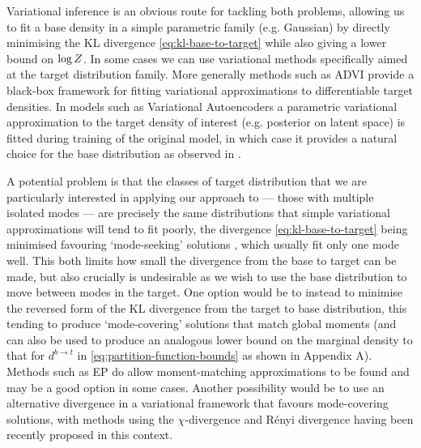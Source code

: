 Variational inference is an obvious route for tackling both problems, allowing us to fit a base density in a simple parametric family (e.g. Gaussian) by directly minimising the KL divergence \eqref{eq:kl-base-to-target} while also giving a lower bound on $\log Z$. In some cases we can use variational methods specifically aimed at the target distribution family. More generally methods such as \ac{ADVI} \citep{kucukelbir2016automatic} provide a black-box framework for fitting variational approximations to differentiable target densities. In models such as Variational Autoencoders \citep{kingma2013auto,rezende2014stochastic} a parametric variational approximation to the target density of interest (e.g. posterior on latent space) is fitted during training of the original model, in which case it provides a natural choice for the base distribution as observed in \citep{wu2016quantitative}. 

A potential problem is that the classes of target distribution that we are particularly interested in applying our approach to --- those with multiple isolated modes --- are precisely the same distributions that simple variational approximations will tend to fit poorly, the divergence \eqref{eq:kl-base-to-target} being minimised favouring `mode-seeking' solutions \citep{bishop2006pattern}, which usually fit only one mode well. This both limits how small the divergence from the base to target can be made, but also crucially is undesirable as we wish to use the base distribution to move between modes in the target.
One option would be to instead to minimise the reversed form of the KL divergence from the target to base distribution, this tending to produce `mode-covering' solutions that match global moments (and can also be used to produce an analogous lower bound on the marginal density to that for $d^{b\to t}$ in \eqref{eq:partition-function-bounds} as shown in Appendix A). Methods such as \ac{EP} \citep{minka2001expectation} do allow moment-matching approximations to be found and may be a good option in some cases. Another possibility would be to use an alternative divergence in a variational framework that favours mode-covering solutions, with methods using the $\chi$-divergence \citep{dieng2016chi} and R\'enyi divergence \citep{li2016renyi} having been recently proposed in this context.

